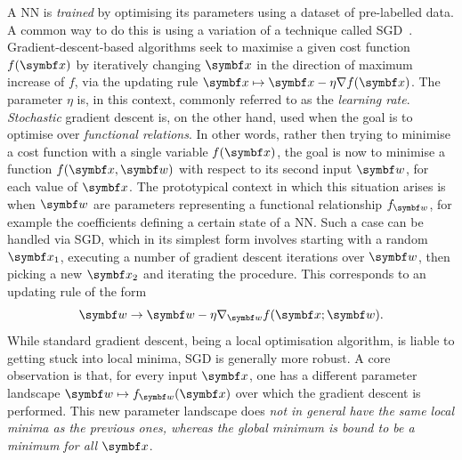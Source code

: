 A \ac{NN} is \emph{trained} by optimising its parameters using a dataset of pre-labelled data.
A common way to do this is using a variation of a technique called \acf{SGD}~\cite{wengert1964a,ruder2016overview}.
Gradient-descent-based algorithms seek to maximise a given cost function $f(\bs x)$ by iteratively changing $\bs x$ in the direction of maximum increase of $f$, via the updating rule $\bs x\mapsto\bs x-\eta\grad f(\bs x)$.
The parameter $\eta$ is, in this context, commonly referred to as the \emph{learning rate}.
\emph{Stochastic} gradient descent is, on the other hand, used when the goal is to optimise over \emph{functional relations}. In other words, rather then trying to minimise a cost function with a single variable $f(\bsx)$, the goal is now to minimise a function $f(\bsx,\bs w)$ with respect to its second input $\bs w$, for each value of $\bs x$.
The prototypical context in which this situation arises is when $\bs w$ are parameters representing a functional relationship $f_{\bs w}$, for example the coefficients defining a certain state of a \ac{NN}.
Such a case can be handled via \ac{SGD}, which in its simplest form involves starting with a random $\bs x_1$, executing a number of gradient descent iterations over $\bs w$, then picking a new $\bs x_2$ and iterating the procedure.
This corresponds to an updating rule of the form
\begin{equation}
	\bs w \to \bs w - \eta\grad_{\bs w}f(\bs x;\bs w).
	\label{eq:GL:updating_rule}
\end{equation}
While standard gradient descent, being a local optimisation algorithm, is liable to getting stuck into local minima, \ac{SGD} is generally more robust.
A core observation is that, for every input $\bsx$, one has a different parameter landscape $\bsw\mapsto f_\bsw(\bsx)$ over which the gradient descent is performed.
This new parameter landscape does \emph{not in general have the same local minima as the previous ones, whereas the global minimum is bound to be a minimum for all $\bsx$}.

